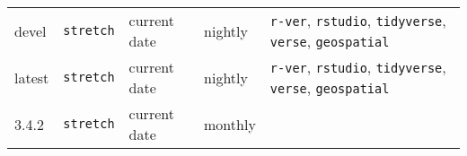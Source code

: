 \begin{longtable}[]{@{}lllll@{}}
\midrule
\endhead
\begin{minipage}[t]{0.09\columnwidth}\raggedright\strut
devel\strut
\end{minipage} & \begin{minipage}[t]{0.12\columnwidth}\raggedright\strut
\texttt{stretch}\strut
\end{minipage} & \begin{minipage}[t]{0.15\columnwidth}\raggedright\strut
current date\strut
\end{minipage} & \begin{minipage}[t]{0.19\columnwidth}\raggedright\strut
nightly\strut
\end{minipage} & \begin{minipage}[t]{0.32\columnwidth}\raggedright\strut
\texttt{r-ver}, \texttt{rstudio}, \texttt{tidyverse}, \texttt{verse},
\texttt{geospatial}\strut
\end{minipage}\tabularnewline
\begin{minipage}[t]{0.09\columnwidth}\raggedright\strut
latest\strut
\end{minipage} & \begin{minipage}[t]{0.12\columnwidth}\raggedright\strut
\texttt{stretch}\strut
\end{minipage} & \begin{minipage}[t]{0.15\columnwidth}\raggedright\strut
current date\strut
\end{minipage} & \begin{minipage}[t]{0.19\columnwidth}\raggedright\strut
nightly\strut
\end{minipage} & \begin{minipage}[t]{0.32\columnwidth}\raggedright\strut
\texttt{r-ver}, \texttt{rstudio}, \texttt{tidyverse}, \texttt{verse},
\texttt{geospatial}\strut
\end{minipage}\tabularnewline
\begin{minipage}[t]{0.09\columnwidth}\raggedright\strut
3.4.2\strut
\end{minipage} & \begin{minipage}[t]{0.12\columnwidth}\raggedright\strut
\texttt{stretch}\strut
\end{minipage} & \begin{minipage}[t]{0.15\columnwidth}\raggedright\strut
current date\strut
\end{minipage} & \begin{minipage}[t]{0.19\columnwidth}\raggedright\strut
monthly\strut
\end{minipage} & \begin{minipage}[t]{0.32\columnwidth}\raggedright\strut

\end{minipage}
\end{longtable}
